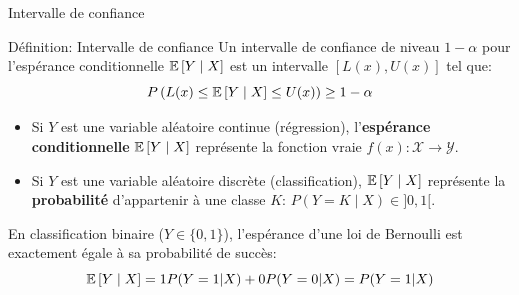 \begin{frame}{Intervalle de confiance}
	\begin{block}{Définition: Intervalle de confiance}
		Un intervalle de confiance de niveau $1 - \alpha$ pour l'espérance conditionnelle $\operatorname{\mathbb{E}}\left[Y \mid X\right]$ est un intervalle $\left[L(x), U(x)\right]$ tel que:
		\begin{equation}
			P\left(L(x) \le \operatorname{\mathbb{E}}\left[Y \mid X\right] \le U(x)\right) \ge 1 - \alpha
			\nonumber
		\end{equation}
		\begin{itemize}
			\item Si $Y$ est une variable aléatoire continue (régression), l'\textbf{espérance conditionnelle} $\operatorname{\mathbb{E}}\left[Y \mid X\right]$ représente la fonction vraie $f(x): \mathcal{X} \to \mathcal{Y}$.
			\item Si $Y$ est une variable aléatoire discrète (classification), $\operatorname{\mathbb{E}}\left[Y \mid X\right]$ représente la \textbf{probabilité} d'appartenir à une classe $K$: $P(Y = K \mid X) \in ]0, 1[$.
		\end{itemize}
	\end{block}
	\pause
	En classification binaire ($Y \in \{0, 1\}$), l'espérance d'une loi de Bernoulli est exactement égale à sa probabilité de succès:
	\begin{equation}
		\operatorname{\mathbb{E}}\left[Y \mid X\right] = 1 P(Y=1 | X) + 0 P(Y=0 | X) = P(Y = 1 | X)
		\nonumber
	\end{equation}
\end{frame}